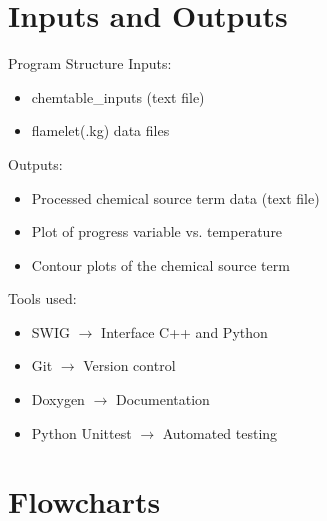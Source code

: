 \documentclass{beamer}
\begin{document}
\section{Inputs and Outputs}
\begin{frame}{Program Structure}
Inputs:
\begin{itemize}
\item chemtable\_inputs (text file) %
\item flamelet(.kg) data files %
\end{itemize}


Outputs:
\begin{itemize}
\item Processed chemical source term data (text file)
\item Plot of progress variable vs. temperature
\item Contour plots of the chemical source term
\end{itemize}

\vspace{12pt}
Tools used:
\begin{itemize}
\item SWIG $\rightarrow$ Interface C++ and Python\\
\item Git $\rightarrow$ Version control\\
\item Doxygen $\rightarrow$ Documentation\\ %
\item Python Unittest $\rightarrow$ Automated testing
\end{itemize}

\end{frame}


\section{Flowcharts}
\end{document}

